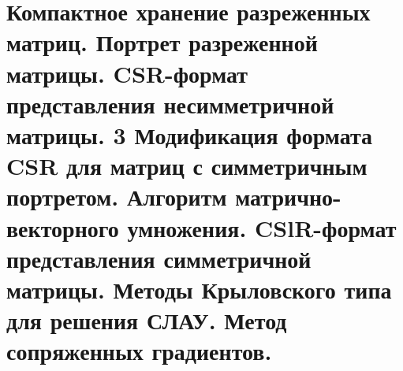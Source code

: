 \documentclass[__main__.tex]{subfiles}
\begin{document}
\section{Компактное хранение разреженных матриц. Портрет разреженной матрицы. CSR-формат представления несимметричной матрицы. 3 Модификация формата CSR для матриц с симметричным портретом. Алгоритм матрично-векторного умножения. CSlR-формат представления симметричной матрицы. Методы Крыловского типа для решения СЛАУ. Метод сопряженных градиентов.}
\end{document}
